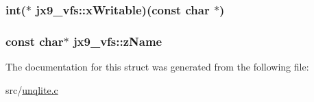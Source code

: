 \hypertarget{structjx9__vfs_ad22c7965193ca4fd233887d0cd1d9bb8}{
\subsubsection[{x\-Writable}]{\setlength{\rightskip}{0pt plus 5cm}int($\ast$ jx9\-\_\-vfs\-::x\-Writable)(const char $\ast$)}}\label{da/d75/structjx9__vfs_ad22c7965193ca4fd233887d0cd1d9bb8}
\hypertarget{structjx9__vfs_afa478797c8306350b3aac8d980057f4a}{
\subsubsection[{z\-Name}]{\setlength{\rightskip}{0pt plus 5cm}const char$\ast$ jx9\-\_\-vfs\-::z\-Name}}\label{da/d75/structjx9__vfs_afa478797c8306350b3aac8d980057f4a}


The documentation for this struct was generated from the following file\-:\begin{DoxyCompactItemize}
\item 
src/\hyperlink{unqlite_8c}{unqlite.\-c}\end{DoxyCompactItemize}
